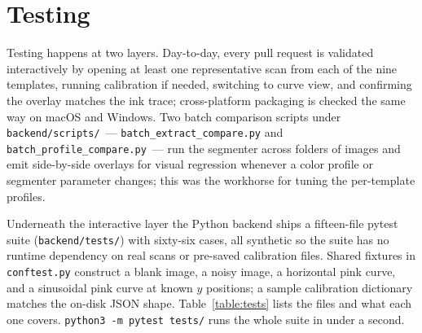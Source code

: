 \documentclass[a4paper,12pt]{report}
\begin{document}
\section{Testing}

Testing happens at two layers. Day-to-day, every pull request is validated interactively by opening at least one representative scan from each of the nine templates, running calibration if needed, switching to curve view, and confirming the overlay matches the ink trace; cross-platform packaging is checked the same way on macOS and Windows. Two batch comparison scripts under \texttt{backend/scripts/}~--- \texttt{batch\_extract\_compare.py} and \texttt{batch\_profile\_compare.py}~--- run the segmenter across folders of images and emit side-by-side overlays for visual regression whenever a color profile or segmenter parameter changes; this was the workhorse for tuning the per-template profiles.

Underneath the interactive layer the Python backend ships a fifteen-file pytest suite (\texttt{backend/tests/}) with sixty-six cases, all synthetic so the suite has no runtime dependency on real scans or pre-saved calibration files. Shared fixtures in \texttt{conftest.py} construct a blank image, a noisy image, a horizontal pink curve, and a sinusoidal pink curve at known $y$ positions; a sample calibration dictionary matches the on-disk JSON shape. Table~\ref{table:tests} lists the files and what each one covers. \texttt{python3 -m pytest tests/} runs the whole suite in under a second.
\end{document}

